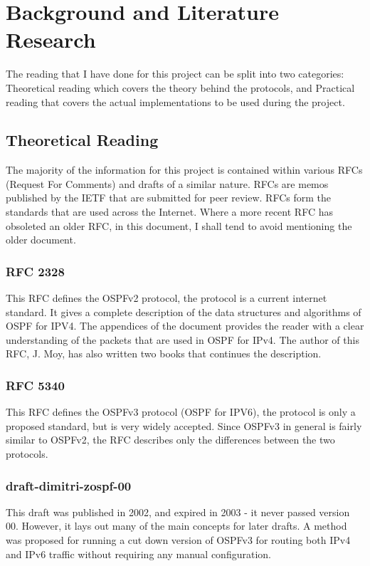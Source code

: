 \documentclass[12pt]{report}
\begin{document}
\chapter{Background and Literature Research}
The reading that I have done for this project can be split into two categories:
Theoretical reading which covers the theory behind the protocols, and Practical 
reading that covers the actual implementations to be used during the project.

\section{Theoretical Reading}
The majority of the information for this project is contained within various
RFCs (Request For Comments) and drafts of a similar nature. RFCs are memos
published by the IETF that are submitted for peer review. RFCs form the
standards that are used across the Internet. Where a more recent RFC has
obsoleted an older RFC, in this document, I shall tend to avoid mentioning the
older document. 

\subsection{RFC 2328} 
This RFC defines the OSPFv2 protocol, the protocol is a current internet
standard. It gives a complete description of the data structures and algorithms
of OSPF for IPV4. The appendices of the document provides the reader with a
clear understanding of the packets that are used in OSPF for IPv4. The author of
this RFC, J. Moy, has also written two books that continues the description. 

\subsection{RFC 5340}
This RFC defines the OSPFv3 protocol (OSPF for IPV6), the protocol is only a
proposed standard, but is very widely accepted.  Since OSPFv3 in general is
fairly similar to OSPFv2, the RFC describes only the differences between the two
protocols. 

\subsection{draft-dimitri-zospf-00}
This draft was published in 2002, and expired in 2003 - it never passed version
00.  However, it lays out many of the main concepts for later drafts.  A method
was proposed for running a cut down version of OSPFv3 for routing both IPv4 and
IPv6 traffic without requiring any manual configuration. 
\end{document}
